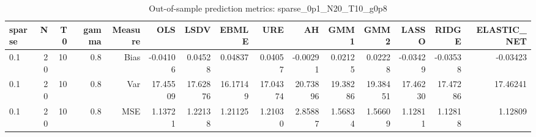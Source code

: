\begin{table}[!htbp]\centering
\caption{Out-of-sample prediction metrics: sparse_0p1_N20_T10_g0p8}
\label{tab:table3_sparse_0p1_N20_T10_g0p8}
\begin{tabular}{lrrrrrrrrrrrrrr}
\hline
sparse & N & T0 & gamma & Measure & OLS & LSDV & EBMLE & URE & AH & GMM1 & GMM2 & LASSO & RIDGE & ELASTIC_NET \\
\hline
0.1 & 20 & 10 & 0.8 & Bias & -0.04106 & 0.04528 & 0.04837 & 0.04057 & -0.00291 & 0.02125 & 0.02228 & -0.03429 & -0.03538 & -0.03423 \\
0.1 & 20 & 10 & 0.8 & Var & 17.45509 & 17.62876 & 16.17149 & 17.04374 & 20.73896 & 19.38286 & 19.38451 & 17.46230 & 17.47286 & 17.46241 \\
0.1 & 20 & 10 & 0.8 & MSE & 1.13721 & 1.22138 & 1.21125 & 1.21030 & 2.85887 & 1.56834 & 1.56609 & 1.12811 & 1.12818 & 1.12809 \\
\hline
\end{tabular}
\end{table}

